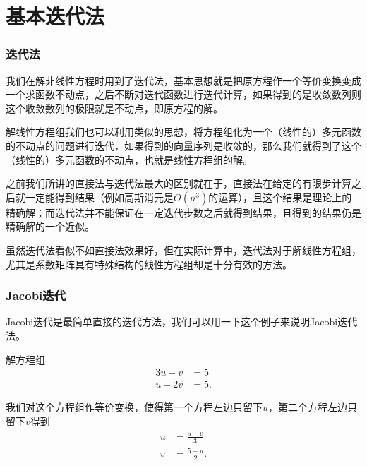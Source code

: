 \documentclass[10pt]{beamer}
\begin{document}

\section{基本迭代法}

\begin{frame}
\frametitle{迭代法}
我们在解非线性方程时用到了迭代法，基本思想就是把原方程作一个等价变换变成一个求函数不动点，之后不断对迭代函数进行迭代计算，如果得到的是收敛数列则这个收敛数列的极限就是不动点，即原方程的解。

\vspace{0.2cm}

解线性方程组我们也可以利用类似的思想，将方程组化为一个（线性的）多元函数的不动点的问题进行迭代，如果得到的向量序列是收敛的，那么我们就得到了这个（线性的）多元函数的不动点，也就是线性方程组的解。

\vspace{0.2cm}

之前我们所讲的直接法与迭代法最大的区别就在于，直接法在给定的有限步计算之后就一定能得到结果（例如高斯消元是$O(n^3)$的运算），且这个结果是理论上的精确解；而迭代法并不能保证在一定迭代步数之后就得到结果，且得到的结果仍是精确解的一个近似。

\vspace{0.2cm}

虽然迭代法看似不如直接法效果好，但在实际计算中，迭代法对于解线性方程组，尤其是系数矩阵具有特殊结构的线性方程组却是十分有效的方法。

\end{frame}


\begin{frame}
\frametitle{Jacobi迭代}
Jacobi迭代是最简单直接的迭代方法，我们可以用一下这个例子来说明Jacobi迭代法。

\begin{example}
解方程组
\begin{align}
\label{eq: Jacobi_1}
3u + v &= 5 \nonumber \\
u + 2v &= 5.
\end{align}
\end{example}

我们对这个方程组作等价变换，使得第一个方程左边只留下$u$，第二个方程左边只留下$v$得到
\begin{align}
\label{eq: Jacobi_2-1}
u &= \frac{5 - v}{3} \nonumber \\
v &= \frac{5-u}{2}.
\end{align}
\end{frame}
\end{document}

